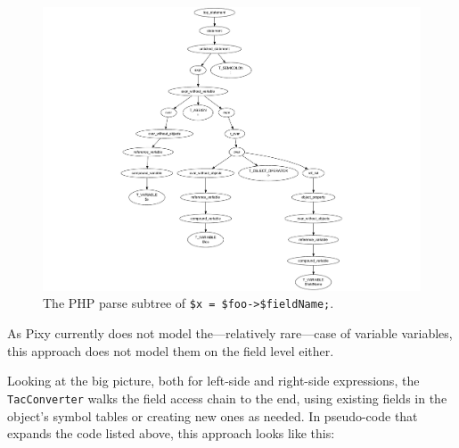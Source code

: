 \begin{figure}[htb]
  \begin{center}
    \includegraphics[trim = 40mm 0mm 0mm 20mm, scale=0.8]{images/variable-field-access-right}
   \caption{The PHP parse subtree of \texttt{\$x = \$foo->\$fieldName;}.}
   \label{fig:variable-field-access-right}
  \end{center}
\end{figure}

As Pixy currently does not model the---relatively rare---case of variable variables, this approach does not model them on the field level either.

Looking at the big picture, both for left-side and right-side expressions, the \texttt{TacConverter} walks the field access chain to the end, using existing fields in the object's symbol tables or creating new ones as needed. In pseudo-code that expands the code listed above, this approach looks like this:

